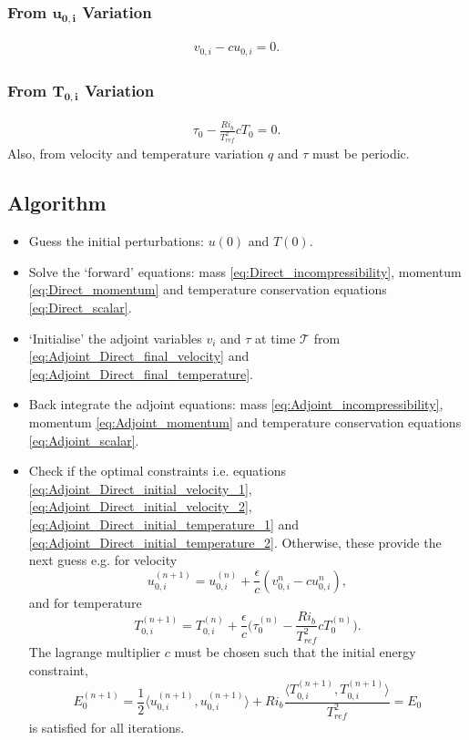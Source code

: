 \documentclass[preprint,12pt]{article}
\begin{document}
\begin{tcolorbox}
\subsubsection*{From $\mathbf{u_{0,i}}$ Variation}
\begin{align}\label{eq:Adjoint_Direct_initial_velocity_2}
v_{0,i}-cu_{0,i}=0.
\end{align}
\subsubsection*{From $\mathbf{T_{0,i}}$ Variation}
\begin{align}\label{eq:Adjoint_Direct_initial_temperature_2}
\tau_{0}-\frac{Ri_b}{T_{ref}^2}cT_{0}=0.
\end{align}
Also, from velocity and temperature variation $q$ and $\tau$ must be periodic.
\end{tcolorbox}
\subsection{Algorithm}
\begin{tcolorbox}
\begin{itemize}
	\item Guess the initial perturbations: $u(0)$ and $T(0)$.
	\item Solve the `forward' equations: mass \eqref{eq:Direct_incompressibility}, momentum \eqref{eq:Direct_momentum} and temperature conservation equations \eqref{eq:Direct_scalar}.
	\item `Initialise' the adjoint variables $v_i$ and $\tau$ at time $\mathcal{T}$ from \eqref{eq:Adjoint_Direct_final_velocity} and \eqref{eq:Adjoint_Direct_final_temperature}.\\
	\item Back integrate the adjoint equations: mass \eqref{eq:Adjoint_incompressibility}, momentum \eqref{eq:Adjoint_momentum} and temperature conservation equations \eqref{eq:Adjoint_scalar}.
	\item Check if the optimal constraints i.e. equations \eqref{eq:Adjoint_Direct_initial_velocity_1}, \eqref{eq:Adjoint_Direct_initial_velocity_2}, \eqref{eq:Adjoint_Direct_initial_temperature_1} and \eqref{eq:Adjoint_Direct_initial_temperature_2}. Otherwise, these provide the next guess e.g. for velocity
	\begin{equation}
	u_{0,i}^{(n+1)}=u_{0,i}^{(n)}+\frac{\epsilon}{c}(v_{0,i}^{n}-cu_{0,i}^{n}),
	\end{equation}
	and for temperature
	\begin{equation}
	T_{0,i}^{(n+1)}=T_{0,i}^{(n)}+\frac{\epsilon}{c}\bigg(\tau_{0}^{(n)}-\frac{Ri_b}{T_{ref}^2}cT_{0}^{(n)}\bigg).
	\end{equation}
	The lagrange multiplier $c$ must be chosen such that the initial energy constraint,
	\begin{equation}
	E_0^{(n+1)}=\frac{1}{2}\Big\langle u_{0,i}^{(n+1)},u_{0,i}^{(n+1)}\Big\rangle+Ri_b \frac{\langle T_{0,i}^{(n+1)},T_{0,i}^{(n+1)}\rangle}{T_{ref}^2}=E_0
	\end{equation}
	is satisfied for all iterations.
\end{itemize}
\end{tcolorbox}
\end{document}
